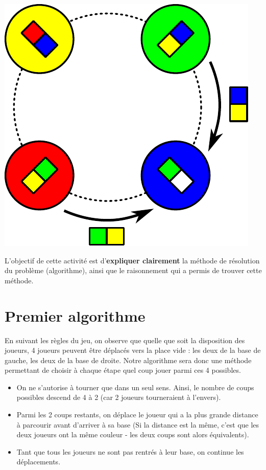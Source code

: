 \documentclass[a5paper,pagesize,DIV=14]{scrbook}
\begin{document}
\begin{center}
  \includegraphics[width=0.3\linewidth]{baseball/baseball_coup.pdf}
\end{center}


L'objectif de cette activité est d'\textbf{expliquer clairement} la méthode de
résolution du problème (algorithme), ainsi que le raisonnement qui a permis de
trouver cette méthode.

\newpage

\section*{Premier algorithme}

En suivant les règles du jeu, on observe que quelle que soit la disposition des
joueurs, 4 joueurs peuvent être déplacés vers la place vide : les deux de la
base de gauche, les deux de la base de droite. Notre algorithme sera donc une
méthode permettant de choisir à chaque étape quel coup jouer parmi ces 4
possibles.

\begin{itemize}
\item On ne s'autorise à tourner que dans un seul sens. Ainsi, le nombre de
  coups possibles descend de 4 à 2 (car 2 joueurs tourneraient à l'envers).
\item Parmi les 2 coups restants, on déplace le joueur qui a la plus grande
  distance à parcourir avant d'arriver à sa base (Si la distance est la même,
  c'est que les deux joueurs ont la même couleur - les deux coups sont alors
  équivalents).
\item Tant que tous les joueurs ne sont pas rentrés à leur base, on continue les
  déplacements.
\end{itemize}
\end{document}
